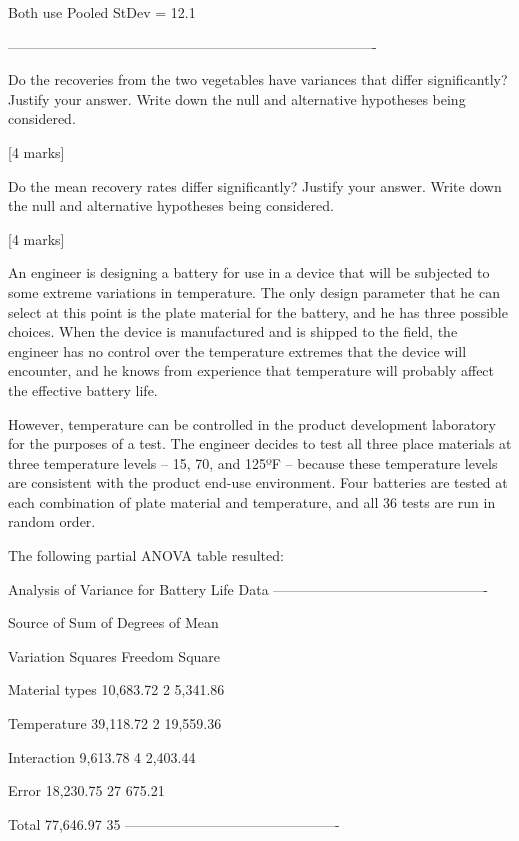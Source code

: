 Both use Pooled StDev = 12.1

-------------------------------------------------------------------------------

Do the recoveries from the two vegetables have variances that differ significantly? Justify your answer. Write down the null and alternative hypotheses being considered.

[4 marks]

Do the mean recovery rates differ significantly? Justify your answer. Write down the null and alternative hypotheses being considered.

[4 marks]






An engineer is designing a battery for use in a device that will be subjected to some extreme variations in temperature. 
The only design parameter that he can select at this point is the plate material for the battery, and he has three possible choices. 
When the device is manufactured and is shipped to the field, the engineer has no control over the temperature extremes that the device will encounter, and he knows from experience 
that temperature will probably affect the effective battery life. 

However, temperature can be controlled in the product development laboratory for the purposes of a test. 
The engineer decides to test all three place materials at three temperature levels – 15, 70, and 125ºF – because these temperature levels are consistent with the product 
end-use environment. Four batteries are tested at each combination of plate material and temperature, and all 36 tests are run in random order.

The following partial ANOVA table resulted:

Analysis of Variance for Battery Life Data
----------------------------------------------

Source of Sum of Degrees of Mean

Variation Squares Freedom Square

Material types 10,683.72 2 5,341.86

Temperature 39,118.72 2 19,559.36

Interaction 9,613.78 4 2,403.44

Error 18,230.75 27 675.21

Total 77,646.97 35
----------------------------------------------


